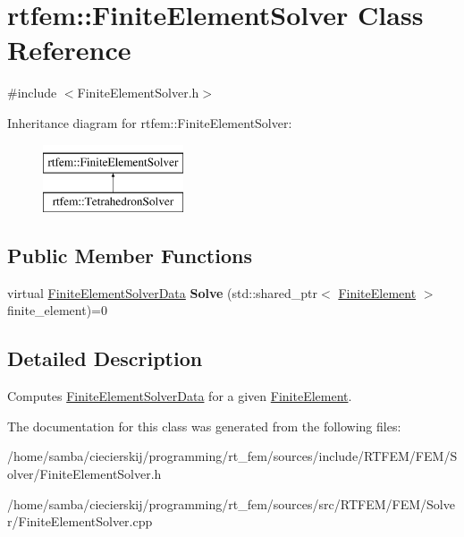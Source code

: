 \hypertarget{classrtfem_1_1FiniteElementSolver}{}\section{rtfem\+:\+:Finite\+Element\+Solver Class Reference}
\label{classrtfem_1_1FiniteElementSolver}


{\ttfamily \#include $<$Finite\+Element\+Solver.\+h$>$}

Inheritance diagram for rtfem\+:\+:Finite\+Element\+Solver\+:\begin{figure}[H]
\begin{center}
\leavevmode
\includegraphics[height=2.000000cm]{classrtfem_1_1FiniteElementSolver}
\end{center}
\end{figure}
\subsection*{Public Member Functions}
\begin{DoxyCompactItemize}
\item 
\mbox{\label{classrtfem_1_1FiniteElementSolver_a4aff399cbe0b356b0187e4c082e17b2c}} 
virtual \hyperlink{structrtfem_1_1FiniteElementSolverData}{Finite\+Element\+Solver\+Data} {\bfseries Solve} (std\+::shared\+\_\+ptr$<$ \hyperlink{classrtfem_1_1FiniteElement}{Finite\+Element} $>$ finite\+\_\+element)=0
\end{DoxyCompactItemize}


\subsection{Detailed Description}
Computes \hyperlink{structrtfem_1_1FiniteElementSolverData}{Finite\+Element\+Solver\+Data} for a given \hyperlink{classrtfem_1_1FiniteElement}{Finite\+Element}. 

The documentation for this class was generated from the following files\+:\begin{DoxyCompactItemize}
\item 
/home/samba/ciecierskij/programming/rt\+\_\+fem/sources/include/\+R\+T\+F\+E\+M/\+F\+E\+M/\+Solver/Finite\+Element\+Solver.\+h\item 
/home/samba/ciecierskij/programming/rt\+\_\+fem/sources/src/\+R\+T\+F\+E\+M/\+F\+E\+M/\+Solver/Finite\+Element\+Solver.\+cpp\end{DoxyCompactItemize}
